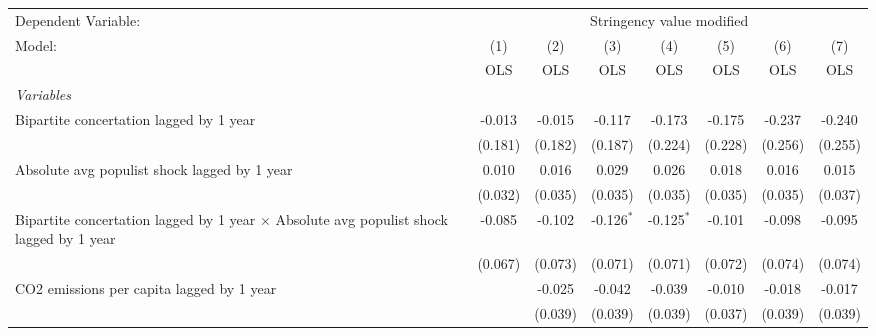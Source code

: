 
\begingroup
\centering
\begin{tabular}{lccccccc}
   \toprule
   Dependent Variable: & \multicolumn{7}{c}{Stringency value modified}\\
   Model:                                                                                         & (1)     & (2)     & (3)          & (4)          & (5)          & (6)          & (7)\\  
                                                                                                  &  OLS    & OLS     & OLS          & OLS          & OLS          & OLS          & OLS\\  
   \midrule
   \emph{Variables}\\
   Bipartite concertation lagged by 1 year                                                        & -0.013  & -0.015  & -0.117       & -0.173       & -0.175       & -0.237       & -0.240\\   
                                                                                                  & (0.181) & (0.182) & (0.187)      & (0.224)      & (0.228)      & (0.256)      & (0.255)\\   
   Absolute avg populist shock lagged by 1 year                                                   & 0.010   & 0.016   & 0.029        & 0.026        & 0.018        & 0.016        & 0.015\\   
                                                                                                  & (0.032) & (0.035) & (0.035)      & (0.035)      & (0.035)      & (0.035)      & (0.037)\\   
   Bipartite concertation lagged by 1 year $\times$ Absolute avg populist shock lagged by 1 year  & -0.085  & -0.102  & -0.126$^{*}$ & -0.125$^{*}$ & -0.101       & -0.098       & -0.095\\   
                                                                                                  & (0.067) & (0.073) & (0.071)      & (0.071)      & (0.072)      & (0.074)      & (0.074)\\   
   CO2 emissions per capita lagged by 1 year                                                      &         & -0.025  & -0.042       & -0.039       & -0.010       & -0.018       & -0.017\\   
                                                                                                  &         & (0.039) & (0.039)      & (0.039)      & (0.037)      & (0.039)      & (0.039)\\   

\end{tabular}
